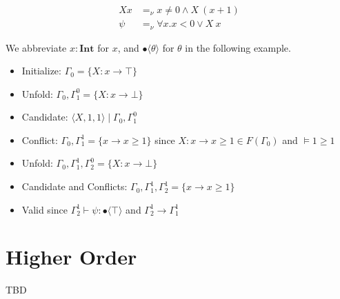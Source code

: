 \documentclass[runningheads]{llncs}
\newcommand \stypeint {\textbf{Int}}
\newcommand \stypebool {\bullet}
\newcommand \typeint[1]{{#1} : \stypeint}
\newcommand \typebool[1]{\stypebool \langle #1 \rangle}
\begin{document}
\begin{align*}
    X x &=_\nu x \neq 0 \land X\ (x + 1) \\
    \psi  &=_\nu \forall x. x < 0 \lor X\ x
\end{align*}

We abbreviate \(\typeint{x}\) for \(x\), and \(\typebool{\theta}\) for
\(\theta\) in the following example.

\begin{itemize}
    \item Initialize: \(\Gamma_0 = \{X: x \rightarrow \top\}\)
    \item Unfold: \(\Gamma_0, \Gamma_1^0 = \{X: x \rightarrow \bot\}\)
    \item Candidate: \(\langle X, 1, 1 \rangle \mid \Gamma_0, \Gamma_1^0\)
    \item Conflict: \(\Gamma_0, \Gamma_1^1 = \{x \rightarrow x \geq 1\}\)
        since \(X: x \rightarrow x \geq 1 \in F(\Gamma_0)\) and \(\models 1 \geq 1\)
    \item Unfold: \(\Gamma_0, \Gamma_1^1, \Gamma_2^0 = \{X: x \rightarrow \bot\}\)
    \item Candidate and Conflicts: \(\Gamma_0, \Gamma_1^1, \Gamma_2^1 = \{x \rightarrow x \geq 1\}\)
    \item Valid since \(\Gamma_2^1 \vdash \psi: \typebool{\top} \)
        and \(\Gamma_2^1 \rightarrow \Gamma_1^1\)
\end{itemize}

\section{Higher Order}

TBD
\end{document}
